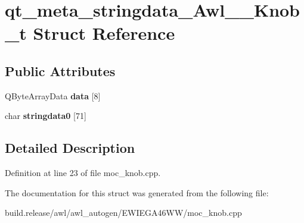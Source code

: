 \hypertarget{structqt__meta__stringdata___awl_____knob__t}{}\section{qt\+\_\+meta\+\_\+stringdata\+\_\+\+Awl\+\_\+\+\_\+\+Knob\+\_\+t Struct Reference}
\label{structqt__meta__stringdata___awl_____knob__t}
\subsection*{Public Attributes}
\begin{DoxyCompactItemize}
\item 
\mbox{\label{structqt__meta__stringdata___awl_____knob__t_a6c54b5ba003caaf05f2ffac7f8a6f3c9}} 
Q\+Byte\+Array\+Data {\bfseries data} \mbox{[}8\mbox{]}
\item 
\mbox{\label{structqt__meta__stringdata___awl_____knob__t_a89197f2d662dd3004904351710b84d3a}} 
char {\bfseries stringdata0} \mbox{[}71\mbox{]}
\end{DoxyCompactItemize}


\subsection{Detailed Description}


Definition at line 23 of file moc\+\_\+knob.\+cpp.



The documentation for this struct was generated from the following file\+:\begin{DoxyCompactItemize}
\item 
build.\+release/awl/awl\+\_\+autogen/\+E\+W\+I\+E\+G\+A46\+W\+W/moc\+\_\+knob.\+cpp\end{DoxyCompactItemize}
